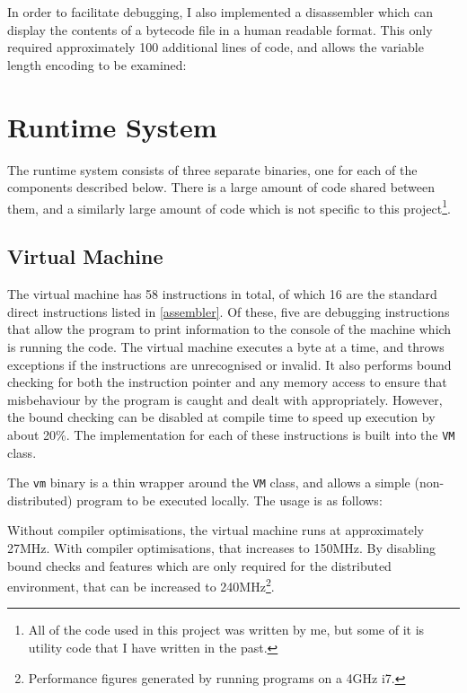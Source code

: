 In order to facilitate debugging, I also implemented a disassembler which can
display the contents of a bytecode file in a human readable format. This only
required approximately 100 additional lines of code, and allows the variable
length encoding to be examined:

\begin{minipage}{.3\textwidth}
  
\end{minipage}
\begin{minipage}{.6\textwidth}
  
\end{minipage}

\section{Runtime System}

The runtime system consists of three separate binaries, one for each of the
components described below. There is a large amount of code shared between them,
and a similarly large amount of code which is not specific to this
project\footnote{All of the code used in this project was written by me, but
some of it is utility code that I have written in the past.}.

\subsection{Virtual Machine}

The virtual machine has 58 instructions in total, of which 16 are the standard
direct instructions listed in \ref{assembler}. Of these, five are debugging
instructions that allow the program to print information to the console of the
machine which is running the code. The virtual machine executes a byte at
a time, and throws exceptions if the instructions are unrecognised or invalid.
It also performs bound checking for both the instruction pointer and any memory
access to ensure that misbehaviour by the program is caught and dealt with
appropriately. However, the bound checking can be disabled at compile time to
speed up execution by about 20\%. The implementation for each of these
instructions is built into the \texttt{VM} class.

The \texttt{vm} binary is a thin wrapper around the \texttt{VM} class, and
allows a simple (non-distributed) program to be executed locally. The usage is
as follows:


Without compiler optimisations, the virtual machine runs at approximately 27MHz.
With compiler optimisations, that increases to 150MHz. By disabling bound checks
and features which are only required for the distributed environment, that can
be increased to 240MHz\footnote{Performance figures generated by running
programs on a 4GHz i7.}.

